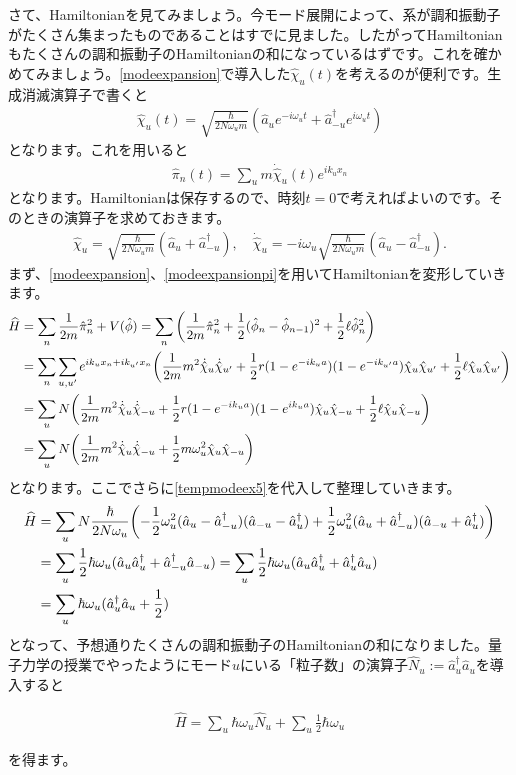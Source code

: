 \documentclass[report,paper=a4, fontsize=12pt, line_length=16cm, number_of_lines=33,dvipdfmx]{jlreq}
\newenvironment{important}{\begin{tcolorbox}[
  colback = white,
  colframe = red!35,
  boxrule = 2mm,
  fonttitle = \bfseries,
  after = \noindent] }{\end{tcolorbox}}
\numberwithin{equation}{chapter}
\newcommand{\phih}{\hat{\phi}}
\newcommand{\chih}{\hat{\chi}}
\newcommand{\pih}{\hat{\pi}}
\newcommand{\Hh}{\widehat{H}}
\newcommand{\ah}{\hat{a}}
\newcommand{\Nh}{\widehat{N}}
\begin{document}
さて、Hamiltonianを見てみましょう。今モード展開によって、系が調和振動子がたくさん集まったものであることはすでに見ました。したがってHamiltonianもたくさんの調和振動子のHamiltonianの和になっているはずです。これを確かめてみましょう。\eqref{modeexpansion}で導入した$\chih_u(t)$を考えるのが便利です。生成消滅演算子で書くと
\begin{align}
  \chih_u(t)=\sqrt{\frac{\hbar}{2N\omega_um}}(\ah_ue^{-i\omega_u t}
  +\ah_{-u}^{\dag}e^{i\omega_u t})
\end{align}
となります。これを用いると
\begin{align}
  \pih_n(t)=\sum_{u}m\dot{\chih}_u(t)e^{ik_ux_n}\label{modeexpansionpi}
\end{align}
となります。Hamiltonianは保存するので、時刻$t=0$で考えればよいのです。そのときの演算子を求めておきます。
\begin{align}
  \chih_u=\sqrt{\frac{\hbar}{2N\omega_um}}(\ah_u
  +\ah_{-u}^{\dag}),\quad
  \dot{\chih}_u=-i\omega_{u}\sqrt{\frac{\hbar}{2N\omega_um}}(\ah_u
  -\ah_{-u}^{\dag}).\label{tempmodeex5}
\end{align}
まず、\eqref{modeexpansion}、\eqref{modeexpansionpi}を用いてHamiltonianを変形していきます。
\begin{align}
  \Hh&=\sum_{n}\frac{1}{2m}\pih_n^2+V(\phih)
  =\sum_{n}\qty(
    \frac{1}{2m}\pih_n^2+\frac12(\phih_n-\phih_{n-1})^2
    +\frac12\ell \phih_n^2
  )\nonumber\\
  &=\sum_n\sum_{u,u'}e^{ik_ux_n+ik_{u'}x_n}\qty(
    \frac{1}{2m}m^2\dot{\chih}_u\dot{\chih}_{u'}
    +\frac12 r (1-e^{-ik_ua})(1-e^{-ik_{u'}a})\chih_u\chih_{u'}
    +\frac12\ell \chih_u\chih_{u'}
  )\nonumber\\
  &=\sum_{u}N\qty(
    \frac{1}{2m}m^2\dot{\chih}_u\dot{\chih}_{-u}
    +\frac12 r (1-e^{-ik_ua})(1-e^{ik_{u}a})\chih_u\chih_{-u}
    +\frac12\ell \chih_u\chih_{-u}
  )\nonumber\\
  &=\sum_{u}N\qty(
    \frac{1}{2m}m^2\dot{\chih}_u\dot{\chih}_{-u}
    +\frac12 m\omega_{u}^2 \chih_u\chih_{-u}
  )
\end{align}
となります。ここでさらに\eqref{tempmodeex5}を代入して整理していきます。
\begin{align}
  \Hh
  &=\sum_{u}N\frac{\hbar}{2N\omega_{u}}\qty(
    -\frac12 \omega_{u}^2(\ah_u-\ah_{-u}^{\dag})(\ah_{-u}-\ah_{u}^{\dag})
    +\frac12 \omega_{u}^2(\ah_u+\ah_{-u}^{\dag})(\ah_{-u}+\ah_{u}^{\dag})
  )\nonumber\\
  &=\sum_{u}\frac12 \hbar\omega_{u}(\ah_{u}\ah_{u}^{\dag}+\ah_{-u}^{\dag}\ah_{-u})=\sum_{u}\frac12 \hbar\omega_{u}(\ah_{u}\ah_{u}^{\dag}+\ah_{u}^{\dag}\ah_{u})\nonumber\\
  &=\sum_{u}\hbar\omega_{u}(\ah_{u}^{\dag}\ah_{u}+\frac12)
\end{align}
となって、予想通りたくさんの調和振動子のHamiltonianの和になりました。量子力学の授業でやったようにモード$u$にいる「粒子数」の演算子$\Nh_u:=\ah_u^{\dag}\ah_u$を導入すると
\begin{important}
\begin{align}
    \Hh = \sum_{u}\hbar
    \omega_{u}\Nh_{u}
    +\sum_{u}\frac12 \hbar\omega_{u}\label{oscillatorhamiltonian}
\end{align}
\end{important}
を得ます。
\end{document}
